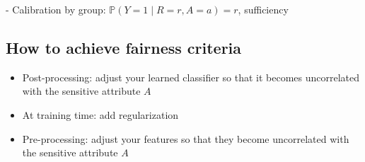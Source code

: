 
- Calibration by group:
$
\mathbb{P}(Y=1 \mid R=r, A=a)=r
$, sufficiency


\subsection*{How to achieve fairness criteria}
\begin{itemize}
  \item Post-processing: adjust your learned classifier so that it becomes uncorrelated with the sensitive attribute $A$

  \item At training time: add regularization

  \item Pre-processing: adjust your features so that they become uncorrelated with the sensitive attribute $A$
\end{itemize}








